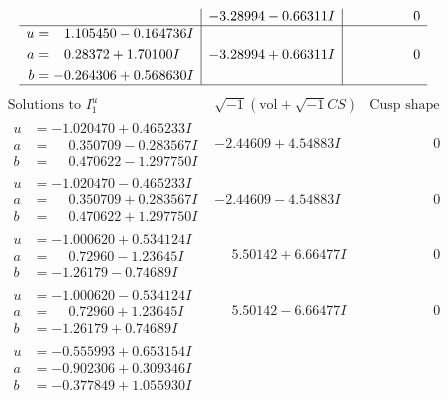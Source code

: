 \documentclass[1p]{elsarticle_modified}
\theoremstyle{definition}
\newcommand{\I}{\sqrt{-1}}
\begin{document}
$$\begin{array}{c|c|c}
 & -3.28994 - 0.66311 I & \phantom{-0.000000 } 0 \\ \hline\begin{aligned}
u &= \phantom{-}1.105450 - 0.164736 I \\
a &= \phantom{-}0.28372 + 1.70100 I \\
b &= -0.264306 + 0.568630 I\end{aligned}
 & -3.28994 + 0.66311 I & \phantom{-0.000000 } 0\\
 \hline 
 \end{array}$$\newpage$$\begin{array}{c|c|c}  
\text{Solutions to }I^u_{1}& \I (\text{vol} + \sqrt{-1}CS) & \text{Cusp shape}\\
 \hline 
\begin{aligned}
u &= -1.020470 + 0.465233 I \\
a &= \phantom{-}0.350709 - 0.283567 I \\
b &= \phantom{-}0.470622 - 1.297750 I\end{aligned}
 & -2.44609 + 4.54883 I & \phantom{-0.000000 } 0 \\ \hline\begin{aligned}
u &= -1.020470 - 0.465233 I \\
a &= \phantom{-}0.350709 + 0.283567 I \\
b &= \phantom{-}0.470622 + 1.297750 I\end{aligned}
 & -2.44609 - 4.54883 I & \phantom{-0.000000 } 0 \\ \hline\begin{aligned}
u &= -1.000620 + 0.534124 I \\
a &= \phantom{-}0.72960 - 1.23645 I \\
b &= -1.26179 - 0.74689 I\end{aligned}
 & \phantom{-}5.50142 + 6.66477 I & \phantom{-0.000000 } 0 \\ \hline\begin{aligned}
u &= -1.000620 - 0.534124 I \\
a &= \phantom{-}0.72960 + 1.23645 I \\
b &= -1.26179 + 0.74689 I\end{aligned}
 & \phantom{-}5.50142 - 6.66477 I & \phantom{-0.000000 } 0 \\ \hline\begin{aligned}
u &= -0.555993 + 0.653154 I \\
a &= -0.902306 + 0.309346 I \\
b &= -0.377849 + 1.055930 I\end{aligned}

\end{array}$$
\end{document}
